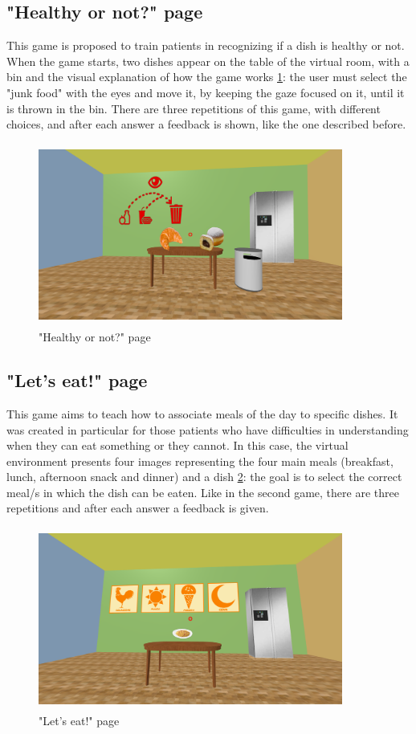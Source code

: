 \subsection{"Healthy or not?" page}
This game is proposed to train patients in recognizing if a dish is healthy or not. When the game starts, two dishes appear on the table of the virtual room, with a bin and the visual explanation of how the game works \ref{fig:healthy}: the user must select the "junk food" with the eyes and move it, by keeping the gaze focused on it, until it is thrown in the bin. There are three repetitions of this game, with different choices, and after each answer a feedback is shown, like the one described before.\\
\begin{figure}[H]
\centering
\includegraphics[width=10cm, height=6cm]{immagini/Healthy.png}
\caption{"Healthy or not?" page}\label{fig:healthy}
\end{figure}
\subsection{"Let's eat!" page}
This game aims to teach how to associate meals of the day to specific dishes. It was created in particular
for those patients who have difficulties in understanding when they can eat something or they cannot. In this case, the virtual environment presents four images representing the four main meals (breakfast, lunch, afternoon snack and dinner) and a dish \ref{fig:eat}: the goal is to select the correct meal/s in which the dish can be eaten. Like in the second game, there are three repetitions and after each answer a feedback is given.\\
\begin{figure}[H]
\centering
\includegraphics[width=10cm, height=6cm]{immagini/Eat.png}
\caption{"Let's eat!" page}\label{fig:eat}
\end{figure}

